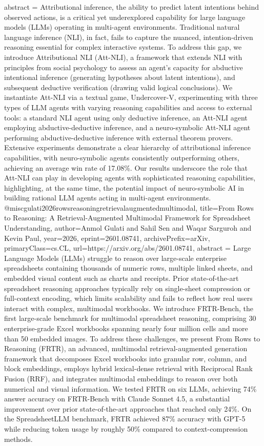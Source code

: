 {      abstract = {Attributional inference, the ability to predict latent intentions behind observed actions, is a critical yet underexplored capability for large language models (LLMs) operating in multi-agent environments. Traditional natural language inference (NLI), in fact, fails to capture the nuanced, intention-driven reasoning essential for complex interactive systems. To address this gap, we introduce Attributional NLI (Att-NLI), a framework that extends NLI with principles from social psychology to assess an agent's capacity for abductive intentional inference (generating hypotheses about latent intentions), and subsequent deductive verification (drawing valid logical conclusions). We instantiate Att-NLI via a textual game, Undercover-V, experimenting with three types of LLM agents with varying reasoning capabilities and access to external tools: a standard NLI agent using only deductive inference, an Att-NLI agent employing abductive-deductive inference, and a neuro-symbolic Att-NLI agent performing abductive-deductive inference with external theorem provers. Extensive experiments demonstrate a clear hierarchy of attributional inference capabilities, with neuro-symbolic agents consistently outperforming others, achieving an average win rate of 17.08\%. Our results underscore the role that Att-NLI can play in developing agents with sophisticated reasoning capabilities, highlighting, at the same time, the potential impact of neuro-symbolic AI in building rational LLM agents acting in multi-agent environments.}
}@misc{gulati2026rowsreasoningretrievalaugmentedmultimodal,
      title={From Rows to Reasoning: A Retrieval-Augmented Multimodal Framework for Spreadsheet Understanding}, 
      author={Anmol Gulati and Sahil Sen and Waqar Sarguroh and Kevin Paul},
      year={2026},
      eprint={2601.08741},
      archivePrefix={arXiv},
      primaryClass={cs.CL},
      url={https://arxiv.org/abs/2601.08741},
      abstract = {Large Language Models (LLMs) struggle to reason over large-scale enterprise spreadsheets containing thousands of numeric rows, multiple linked sheets, and embedded visual content such as charts and receipts. Prior state-of-the-art spreadsheet reasoning approaches typically rely on single-sheet compression or full-context encoding, which limits scalability and fails to reflect how real users interact with complex, multimodal workbooks. We introduce FRTR-Bench, the first large-scale benchmark for multimodal spreadsheet reasoning, comprising 30 enterprise-grade Excel workbooks spanning nearly four million cells and more than 50 embedded images. To address these challenges, we present From Rows to Reasoning (FRTR), an advanced, multimodal retrieval-augmented generation framework that decomposes Excel workbooks into granular row, column, and block embeddings, employs hybrid lexical-dense retrieval with Reciprocal Rank Fusion (RRF), and integrates multimodal embeddings to reason over both numerical and visual information. We tested FRTR on six LLMs, achieving 74\% answer accuracy on FRTR-Bench with Claude Sonnet 4.5, a substantial improvement over prior state-of-the-art approaches that reached only 24\%. On the SpreadsheetLLM benchmark, FRTR achieved 87\% accuracy with GPT-5 while reducing token usage by roughly 50\% compared to context-compression methods.}
}
